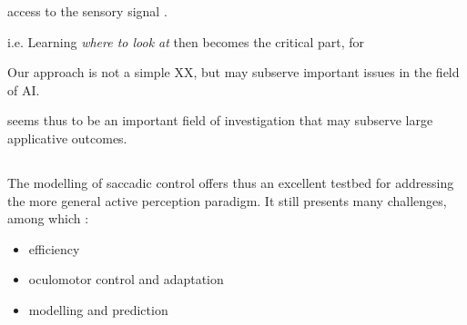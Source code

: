 \documentclass{article} %
\begin{document}
	access to the sensory signal . 
	
	i.e. Learning \emph{where to look at} then becomes the critical part, for 
	
	Our approach is not a simple XX, but may subserve important issues in the field of AI. 
	
	 seems thus to be an important field of investigation that may subserve large applicative outcomes.  
	
	

	
	\subsection{}
	
	
	
	
	The modelling of saccadic control offers thus an excellent testbed for addressing the more general active perception paradigm. It still presents many challenges, among which :
	\begin{itemize}
		\item efficiency
		\item oculomotor control and adaptation
		\item modelling and prediction
	\end{itemize}
	
\end{document}
